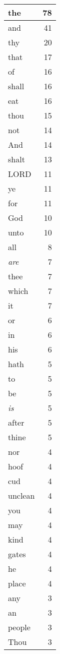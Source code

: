 \begin{center}
\begin{longtable}{l|r}
\hline \hline
\endlastfoot
the & 78 \\ \hline
and & 41 \\ \hline
thy & 20 \\ \hline
that & 17 \\ \hline
of & 16 \\ \hline
shall & 16 \\ \hline
eat & 16 \\ \hline
thou & 15 \\ \hline
not & 14 \\ \hline
And & 14 \\ \hline
shalt & 13 \\ \hline
LORD & 11 \\ \hline
ye & 11 \\ \hline
for & 11 \\ \hline
God & 10 \\ \hline
unto & 10 \\ \hline
all & 8 \\ \hline
\emph{are} & 7 \\ \hline
thee & 7 \\ \hline
which & 7 \\ \hline
it & 7 \\ \hline
or & 6 \\ \hline
in & 6 \\ \hline
his & 6 \\ \hline
hath & 5 \\ \hline
to & 5 \\ \hline
be & 5 \\ \hline
\emph{is} & 5 \\ \hline
after & 5 \\ \hline
thine & 5 \\ \hline
nor & 4 \\ \hline
hoof & 4 \\ \hline
cud & 4 \\ \hline
unclean & 4 \\ \hline
you & 4 \\ \hline
may & 4 \\ \hline
kind & 4 \\ \hline
gates & 4 \\ \hline
he & 4 \\ \hline
place & 4 \\ \hline
any & 3 \\ \hline
an & 3 \\ \hline
people & 3 \\ \hline
Thou & 3 \\ \hline

\end{longtable}
\end{center}
